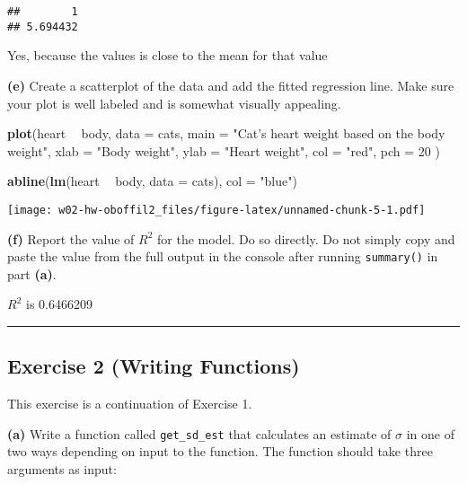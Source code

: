 \documentclass[]{article}
\newenvironment{Shaded}{\begin{snugshade}}{\end{snugshade}}
\newcommand{\DataTypeTok}[1]{\textcolor[rgb]{0.13,0.29,0.53}{#1}}
\newcommand{\DecValTok}[1]{\textcolor[rgb]{0.00,0.00,0.81}{#1}}
\newcommand{\KeywordTok}[1]{\textcolor[rgb]{0.13,0.29,0.53}{\textbf{#1}}}
\newcommand{\NormalTok}[1]{#1}
\newcommand{\OperatorTok}[1]{\textcolor[rgb]{0.81,0.36,0.00}{\textbf{#1}}}
\newcommand{\StringTok}[1]{\textcolor[rgb]{0.31,0.60,0.02}{#1}}
\begin{document}
\begin{verbatim}
##        1 
## 5.694432
\end{verbatim}

Yes, because the values is close to the mean for that value

\textbf{(e)} Create a scatterplot of the data and add the fitted
regression line. Make sure your plot is well labeled and is somewhat
visually appealing.

\begin{Shaded}
\begin{Highlighting}[]
\KeywordTok{plot}\NormalTok{(heart }\OperatorTok{~}\StringTok{ }\NormalTok{body, }\DataTypeTok{data =}\NormalTok{ cats, }\DataTypeTok{main =} \StringTok{"Cat's heart weight based on the body weight"}\NormalTok{,}
     \DataTypeTok{xlab =} \StringTok{"Body weight"}\NormalTok{, }\DataTypeTok{ylab =} \StringTok{"Heart weight"}\NormalTok{, }\DataTypeTok{col =} \StringTok{"red"}\NormalTok{, }\DataTypeTok{pch  =} \DecValTok{20} 
\NormalTok{     )}

\KeywordTok{abline}\NormalTok{(}\KeywordTok{lm}\NormalTok{(heart }\OperatorTok{~}\StringTok{ }\NormalTok{body, }\DataTypeTok{data =}\NormalTok{ cats), }\DataTypeTok{col =} \StringTok{"blue"}\NormalTok{)}
\end{Highlighting}
\end{Shaded}

\texttt{[image: w02-hw-oboffil2\_files/figure-latex/unnamed-chunk-5-1.pdf]}

\textbf{(f)} Report the value of \(R^2\) for the model. Do so directly.
Do not simply copy and paste the value from the full output in the
console after running \texttt{summary()} in part \textbf{(a)}.

\(R^2\) is 0.6466209

\begin{center}\rule{0.5\linewidth}{0.5pt}\end{center}

\hypertarget{exercise-2-writing-functions}{%
\subsection{Exercise 2 (Writing
Functions)}\label{exercise-2-writing-functions}}

This exercise is a continuation of Exercise 1.

\textbf{(a)} Write a function called \texttt{get\_sd\_est} that
calculates an estimate of \(\sigma\) in one of two ways depending on
input to the function. The function should take three arguments as
input:
\end{document}
